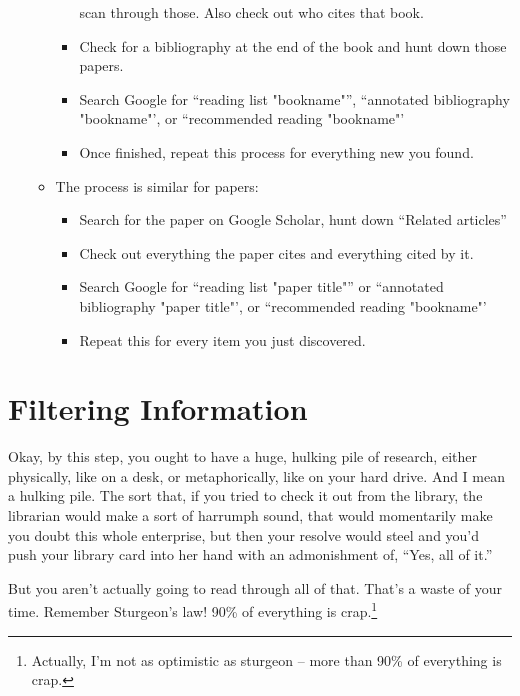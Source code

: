 \begin{enumerate}
\begin{itemize}
\begin{itemize}
      scan through those. Also check out who cites that book.
    \item Check for a bibliography at the end of the book and hunt down those
      papers.
    \item Search Google for ``reading list "bookname"'', ``annotated
      bibliography "bookname"', or ``recommended reading "bookname"'
    \item Once finished, repeat this process for everything new you found.
    \end{itemize}
  \item The process is similar for papers:
    \begin{itemize}
    \item Search for the paper on Google Scholar, hunt down ``Related articles''
    \item Check out everything the paper cites and everything cited by it.
    \item Search Google for ``reading list "paper title"'' or ``annotated
      bibliography "paper title"', or ``recommended reading "bookname"'
    \item Repeat this for every item you just discovered.
    \end{itemize}
  \end{itemize}
\end{enumerate}

\section{Filtering Information}

Okay, by this step, you ought to have a huge, hulking pile of research, either
physically, like on a desk, or metaphorically, like on your hard drive. And I
mean a hulking pile. The sort that, if you tried to check it out from the
library, the librarian would make a sort of harrumph sound, that would
momentarily make you doubt this whole enterprise, but then your resolve would
steel and you'd push your library card into her hand with an admonishment of,
``Yes, all of it.''

But you aren't actually going to read through all of that. That's a waste of
your time. Remember Sturgeon's law! 90\% of everything is
crap.\footnote{Actually, I'm not as optimistic as sturgeon -- more than 90\% of
  everything is crap.}

